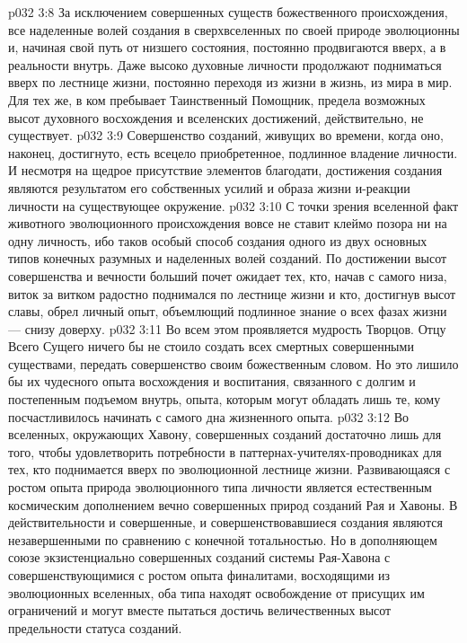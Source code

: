 \vs p032 3:8 \pc За исключением совершенных существ божественного происхождения, все наделенные волей создания в сверхвселенных по своей природе эволюционны и, начиная свой путь от низшего состояния, постоянно продвигаются вверх, а в реальности внутрь. Даже высоко духовные личности продолжают подниматься вверх по лестнице жизни, постоянно переходя из жизни в жизнь, из мира в мир. Для тех же, в ком пребывает Таинственный Помощник, предела возможных высот духовного восхождения и вселенских достижений, действительно, не существует.
\vs p032 3:9 Совершенство созданий, живущих во времени, когда оно, наконец, достигнуто, есть всецело приобретенное, подлинное владение личности. И несмотря на щедрое присутствие элементов благодати, достижения создания являются результатом его собственных усилий и образа жизни и\hyp{}реакции личности на существующее окружение.
\vs p032 3:10 С точки зрения вселенной факт животного эволюционного происхождения вовсе не ставит клеймо позора ни на одну личность, ибо таков особый способ создания одного из двух основных типов конечных разумных и наделенных волей созданий. По достижении высот совершенства и вечности больший почет ожидает тех, кто, начав с самого низа, виток за витком радостно поднимался по лестнице жизни и кто, достигнув высот славы, обрел личный опыт, объемлющий подлинное знание о всех фазах жизни --- снизу доверху.
\vs p032 3:11 Во всем этом проявляется мудрость Творцов. Отцу Всего Сущего ничего бы не стоило создать всех смертных совершенными существами, передать совершенство своим божественным словом. Но это лишило бы их чудесного опыта восхождения и воспитания, связанного с долгим и постепенным подъемом внутрь, опыта, которым могут обладать лишь те, кому посчастливилось начинать с самого дна жизненного опыта.
\vs p032 3:12 Во вселенных, окружающих Хавону, совершенных созданий достаточно лишь для того, чтобы удовлетворить потребности в паттернах\hyp{}учителях\hyp{}проводниках для тех, кто поднимается вверх по эволюционной лестнице жизни. Развивающаяся с ростом опыта природа эволюционного типа личности является естественным космическим дополнением вечно совершенных природ созданий Рая и Хавоны. В действительности и совершенные, и совершенствовавшиеся создания являются незавершенными по сравнению с конечной тотальностью. Но в дополняющем союзе экзистенциально совершенных созданий системы Рая\hyp{}Хавона с совершенствующимися с ростом опыта финалитами, восходящими из эволюционных вселенных, оба типа находят освобождение от присущих им ограничений и могут вместе пытаться достичь величественных высот предельности статуса созданий.
